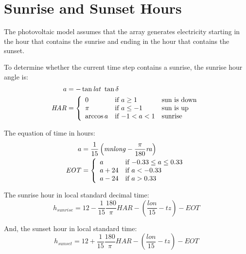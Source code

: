 \documentclass[12pt,letterpaper]{article}
\begin{document}
\section{Sunrise and Sunset Hours}\label{sec-sunriseset}

The photovoltaic model assumes that the array generates electricity starting in the hour that contains the sunrise and ending in the hour that contains the sunset.

To determine whether the current time step contains a sunrise, the sunrise hour angle is:
\begin{align}\label{eqn-sunriseha}
a &= -\tan \mathit{lat}~\tan\delta\notag\\
\mathit{HAR} &= 
\left\{
   \begin{array}{lll}
      0 & \text{if $a\geq1$} & \text{sun is down}\\
      \pi & \text{if $a\leq-1$} & \text{sun is up}\\
      \arccos a & \text{if $-1<a<1$} & \text{sunrise}
   \end{array}
\right. 
\end{align}

The equation of time in hours:
\begin{align}\label{eqn-eot}
a &= \frac{1}{15}\left(\mathit{mnlong} - \frac{\pi}{180}\mathit{ra}\right)\notag\\
\mathit{EOT} &= 
\left\{
   \begin{array}{ll}
     a & \text{if $-0.33 \leq a \leq 0.33$}\\
     a + 24 & \text{if $a<-0.33$}\\
     a - 24 & \text{if $a>0.33$}
   \end{array}
\right. 
\end{align}

The sunrise hour in local standard decimal time:
\begin{equation}
h_{sunrise} = 12 - \frac{1}{15} \frac{180}{\pi}\mathit{HAR} - \left(\frac{\mathit{lon}}{15} - \mathit{tz}\right)-\mathit{EOT}
\end{equation}

And, the sunset hour in local standard time: 
\begin{equation}
h_{sunset} = 12 + \frac{1}{15} \frac{180}{\pi}\mathit{HAR} - \left(\frac{\mathit{lon}}{15} - \mathit{tz}\right)-\mathit{EOT}
\end{equation}
\end{document}
